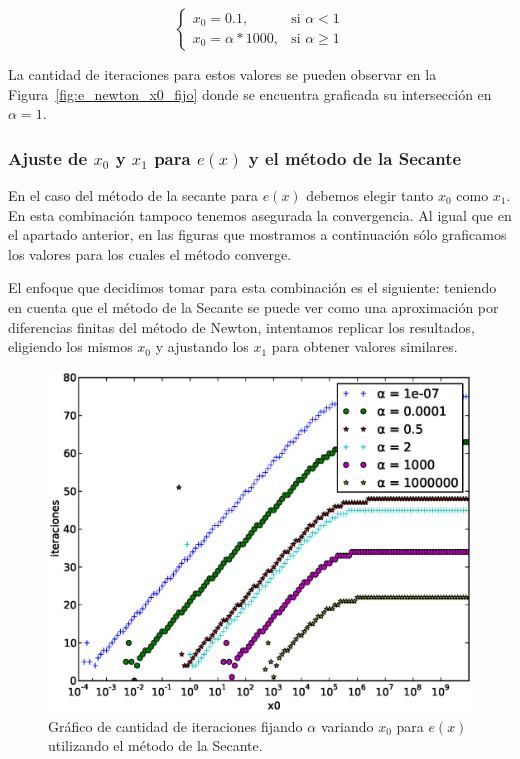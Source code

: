 \[
\begin{cases}
x_0 = 0.1, & \mbox{si } \alpha < 1\\
x_0 = \alpha * 1000, & \mbox{si } \alpha \ge 1
\end{cases}
\]

La cantidad de iteraciones para estos valores se pueden observar en la
Figura~\ref{fig:e_newton_x0_fijo} donde se encuentra graficada su intersección
en $\alpha = 1$.

\subsubsection{Ajuste de $x_0$ y $x_1$ para $e(x)$ y el método de la Secante}

En el caso del método de la secante para $e(x)$ debemos elegir tanto $x_0$ como
$x_1$. En esta combinación tampoco tenemos asegurada la convergencia.  Al igual
que en el apartado anterior, en las figuras que mostramos a continuación sólo
graficamos los valores para los cuales el método converge.

El enfoque que decidimos tomar para esta combinación es el siguiente: teniendo
en cuenta que el método de la Secante se puede ver como una aproximación por
diferencias finitas del método de Newton, intentamos replicar los resultados,
eligiendo los mismos $x_0$ y ajustando los $x_1$ para obtener valores
similares.

\begin{figure}[!htbp]
  \begin{center}
    \includegraphics[scale=0.5]{graficos/new/e_secante_x0_variable.eps}
    \caption{\label{fig:e_secante_x0_variable} Gráfico de cantidad de iteraciones fijando $\alpha$ variando $x_0$ para $e(x)$ utilizando el método de la Secante.}
  \end{center}
\end{figure}


